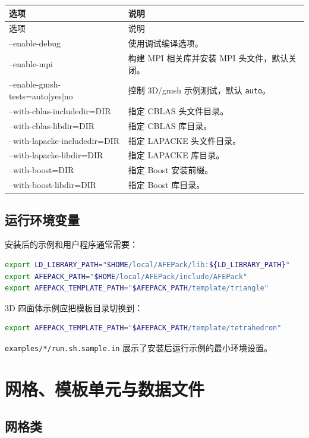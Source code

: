\documentclass[UTF8,openany,zihao=-4,scheme=chinese]{ctexbook}
\newcommand{\file}[1]{\nolinkurl{#1}}
\newcommand{\cmd}[1]{\texttt{#1}}
\begin{document}
\begin{longtable}{>{\ttfamily}p{}p{}}
\toprule
选项 & 说明\\
\midrule
\endfirsthead
\toprule
选项 & 说明\\
\midrule
\endhead
--enable-debug & 使用调试编译选项。\\
--enable-mpi & 构建 MPI 相关库并安装 MPI 头文件，默认关闭。\\
--enable-gmsh-tests=auto|yes|no & 控制 3D/gmsh 示例测试，默认 \cmd{auto}。\\
--with-cblas-includedir=DIR & 指定 CBLAS 头文件目录。\\
--with-cblas-libdir=DIR & 指定 CBLAS 库目录。\\
--with-lapacke-includedir=DIR & 指定 LAPACKE 头文件目录。\\
--with-lapacke-libdir=DIR & 指定 LAPACKE 库目录。\\
--with-boost=DIR & 指定 Boost 安装前缀。\\
--with-boost-libdir=DIR & 指定 Boost 库目录。\\
\bottomrule
\end{longtable}

\section{运行环境变量}

安装后的示例和用户程序通常需要：

\begin{lstlisting}[language=bash]
export LD_LIBRARY_PATH="$HOME/local/AFEPack/lib:${LD_LIBRARY_PATH}"
export AFEPACK_PATH="$HOME/local/AFEPack/include/AFEPack"
export AFEPACK_TEMPLATE_PATH="$AFEPACK_PATH/template/triangle"
\end{lstlisting}

3D 四面体示例应把模板目录切换到：

\begin{lstlisting}[language=bash]
export AFEPACK_TEMPLATE_PATH="$AFEPACK_PATH/template/tetrahedron"
\end{lstlisting}

\file{examples/*/run.sh.sample.in} 展示了安装后运行示例的最小环境设置。

\chapter{网格、模板单元与数据文件}

\section{网格类}
\end{document}
